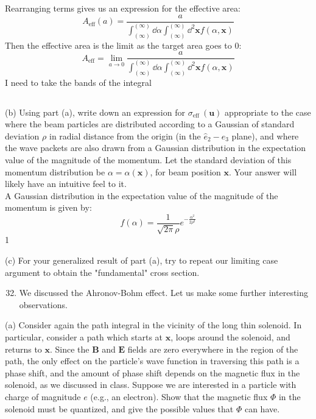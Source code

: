 \documentclass[12pt]{article}
\begin{document}
Rearranging terms gives us an expression for the effective area:
\begin{equation}
A_{\text{eff}}(a) = \frac{a}{\int_{(\infty)}^{(\infty)} \dd{\alpha} \int_{(\infty)}^{(\infty)} \dd^2{\textbf{x}} f(\alpha, \textbf{x})}
\end{equation}
Then the effective area is the limit as the target area goes to 0:
\begin{equation}
A_{\text{eff}} = \lim_{a \to 0} \frac{a}{\int_{(\infty)}^{(\infty)} \dd{\alpha} \int_{(\infty)}^{(\infty)} \dd^2{\textbf{x}} f(\alpha, \textbf{x})}
\end{equation}
I need to take the bands of the integral
\subsection{}

(b) Using part (a), write down an expression for $\sigma_{\text {eff }}(\mathbf{u})$ appropriate to the case where the beam particles are distributed according to a Gaussian of standard deviation $\rho$ in radial distance from the origin (in the $\hat{e}_{2}-\hat{e}_{3}$ plane), and where the wave packets are also drawn from a Gaussian distribution in the expectation value of the magnitude of the momentum. Let the standard deviation of this momentum distribution be $\alpha=\alpha(\mathbf{x})$, for beam position $\mathbf{x}$. Your answer will likely have an intuitive feel to it.\\
A Gaussian distribution in the expectation value of the magnitude of the momentum is given by:
\begin{equation}
f(\alpha) = \frac{1}{\sqrt{2 \pi} \rho} e^{-\frac{\alpha^2}{2 \rho^2}}
\end{equation}1

(c) For your generalized result of part (a), try to repeat our limiting case argument to obtain the "fundamental" cross section.

\begin{enumerate}
  \setcounter{enumi}{31}
  \item We discussed the Ahronov-Bohm effect. Let us make some further interesting observations.
\end{enumerate}

(a) Consider again the path integral in the vicinity of the long thin solenoid. In particular, consider a path which starts at $\boldsymbol{x}$, loops around the solenoid, and returns to $\boldsymbol{x}$. Since the $\boldsymbol{B}$ and $\boldsymbol{E}$ fields are zero everywhere in the region of the path, the only effect on the particle's wave function in traversing this path is a phase shift, and the amount of phase shift depends on the magnetic flux in the solenoid, as we discussed in class. Suppose we are interested in a particle with charge of magnitude $e$ (e.g., an electron). Show that the magnetic flux $\Phi$ in the solenoid must be quantized, and give the possible values that $\Phi$ can have.
\end{document}
